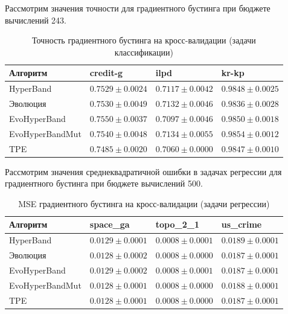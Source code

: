 \documentclass[a4paper,12pt]{article}
\begin{document}
Рассмотрим значения точности для градиентного бустинга при бюджете вычислений 243.
\begin{table}[h]
\centering
\begin{tabular}{|l|l|l|l|}
\hline
Алгоритм               & credit-g                     & ilpd                         & kr-kp                        \\ \hline
HyperBand              & $0.7529 \pm 0.0024$          & $0.7117 \pm 0.0042$          & $0.9848 \pm 0.0025$          \\ \hline
Эволюция               & $0.7530 \pm 0.0049$          & $0.7132 \pm 0.0046$          & $0.9836 \pm 0.0028$          \\ \hline
EvoHyperBand           & $\mathbf{0.7550 \pm 0.0037}$ & $0.7097 \pm 0.0046$          & $0.9850 \pm 0.0018$          \\ \hline
EvoHyperBandMut & $0.7540 \pm 0.0048$          & $\mathbf{0.7134 \pm 0.0055}$ & $\mathbf{0.9854 \pm 0.0012}$ \\ \hline
TPE                    & $0.7485 \pm 0.0020$          & $0.7060 \pm 0.0000$          & $0.9847 \pm 0.0010$          \\ \hline
\end{tabular}
\caption{Точность градиентного бустинга на кросс-валидации (задачи классификации)}
\label{tab:boosting}
\end{table}

\newpage

Рассмотрим значения среднеквадратичной ошибки в задачах регрессии для градиентного бустинга при бюджете вычислений 500.
\begin{table}[h]
\centering
\begin{tabular}{|l|l|l|l|}
\hline
Алгоритм               & space\_ga                     & topo\_2\_1                     & us\_crime                     \\ \hline
HyperBand              & $0.0129 \pm 0.0001$          & $0.0008 \pm 0.0001$          & $0.0189 \pm 0.0001$          \\ \hline
Эволюция               & $0.0128 \pm 0.0002$          & $\mathbf{0.0008 \pm 0.0000}$ & $0.0187 \pm 0.0001$          \\ \hline
EvoHyperBand           & $0.0129 \pm 0.0002$          & $0.0008 \pm 0.0001$          & $\mathbf{0.0187 \pm 0.0001}$ \\ \hline
EvoHyperBandMut & $\mathbf{0.0128 \pm 0.0001}$ & $\mathbf{0.0008 \pm 0.0000}$ & $0.0188 \pm 0.0001$          \\ \hline
TPE                    & $\mathbf{0.0128 \pm 0.0001}$ & $\mathbf{0.0008 \pm 0.0000}$ & $\mathbf{0.0187 \pm 0.0001}$ \\ \hline
\end{tabular}
\caption{MSE градиентного бустинга на кросс-валидации (задачи регрессии)}
\label{tab:boosting_regr}
\end{table}
\end{document}
